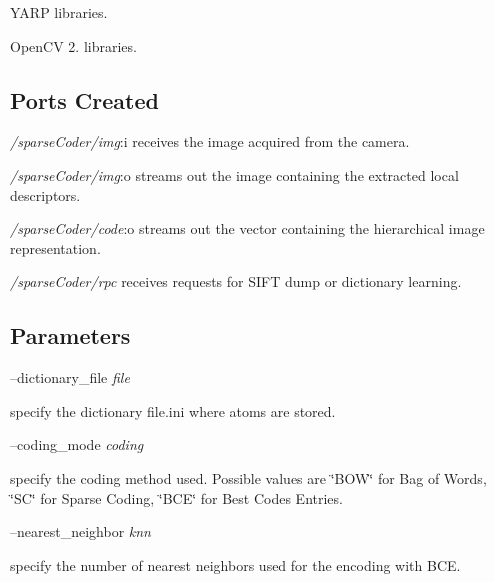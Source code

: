 \begin{DoxyItemize}
\item Y\+A\+RP libraries.
\item Open\+CV 2. libraries.
\end{DoxyItemize}\hypertarget{group__icub__sparseCoder_portsc_sec}{}\subsection{Ports Created}\label{group__icub__sparseCoder_portsc_sec}

\begin{DoxyItemize}
\item {\itshape /sparse\+Coder/img}\+:i receives the image acquired from the camera.
\item {\itshape /sparse\+Coder/img}\+:o streams out the image containing the extracted local descriptors.
\item {\itshape /sparse\+Coder/code}\+:o streams out the vector containing the hierarchical image representation.
\item {\itshape /sparse\+Coder/rpc} receives requests for S\+I\+FT dump or dictionary learning.
\end{DoxyItemize}\hypertarget{group__icub__sparseCoder_parameters_sec}{}\subsection{Parameters}\label{group__icub__sparseCoder_parameters_sec}
--dictionary\+\_\+file {\itshape file} 
\begin{DoxyItemize}
\item specify the dictionary file.\+ini where atoms are stored.
\end{DoxyItemize}

--coding\+\_\+mode {\itshape coding} 
\begin{DoxyItemize}
\item specify the coding method used. Possible values are \char`\"{}\+B\+O\+W\char`\"{} for Bag of Words, \char`\"{}\+S\+C\char`\"{} for Sparse Coding, \char`\"{}\+B\+C\+E\char`\"{} for Best Codes Entries.
\end{DoxyItemize}

--nearest\+\_\+neighbor {\itshape knn} 
\begin{DoxyItemize}
\item specify the number of nearest neighbors used for the encoding with B\+CE.
\end{DoxyItemize}

